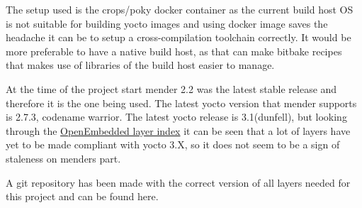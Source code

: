 \documentclass[../../main.tex]{subfiles}
\begin{document}
The setup used is the crops/poky docker container as the current build host OS is
not suitable for building yocto images and using docker image saves the headache it can be to
setup a cross-compilation toolchain correctly.
It would be more preferable to have a native build host, as that can make bitbake recipes
that makes use of libraries of the build host easier to manage.

At the time of the project start mender 2.2 was the latest stable release and therefore it
is the one being used.
The latest yocto version that mender supports is 2.7.3, codename warrior.
The latest yocto release is 3.1(dunfell), but looking through the
\href{https://layers.openembedded.org/layerindex/branch/master/layers/}{OpenEmbedded layer index}
it can be seen that a lot of layers have yet to be made compliant with yocto 3.X, so it does not
seem to be a sign of staleness on menders part.

A git repository has been made with the correct version of all layers needed for this project and
can be found here.
\end{document}
